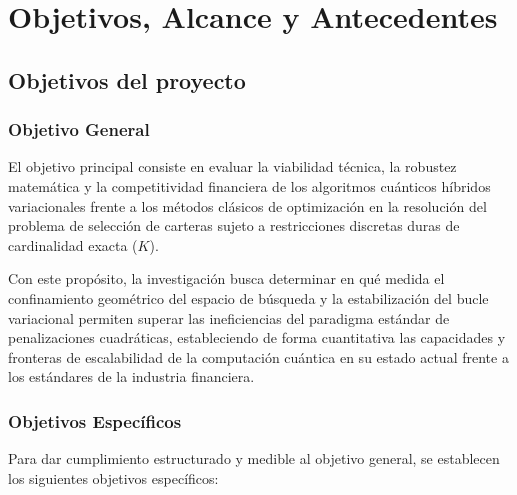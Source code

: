 \chapter{Objetivos, Alcance y Antecedentes}
\label{cap:objetivos_alcance_antecedentes}

\section{Objetivos del proyecto}
\label{sec:objetivos_proyecto}

\subsection{Objetivo General}
El objetivo principal consiste en evaluar la viabilidad técnica, la robustez matemática y la competitividad financiera de los algoritmos cuánticos híbridos variacionales frente a los métodos clásicos de optimización en la resolución del problema de selección de carteras sujeto a restricciones discretas duras de cardinalidad exacta ($K$).

Con este propósito, la investigación busca determinar en qué medida el confinamiento geométrico del espacio de búsqueda y la estabilización del bucle variacional permiten superar las ineficiencias del paradigma estándar de penalizaciones cuadráticas, estableciendo de forma cuantitativa las capacidades y fronteras de escalabilidad de la computación cuántica en su estado actual frente a los estándares de la industria financiera.

\subsection{Objetivos Específicos}
\label{sec:objetivos_especificos}
Para dar cumplimiento estructurado y medible al objetivo general, se establecen los siguientes objetivos específicos:

